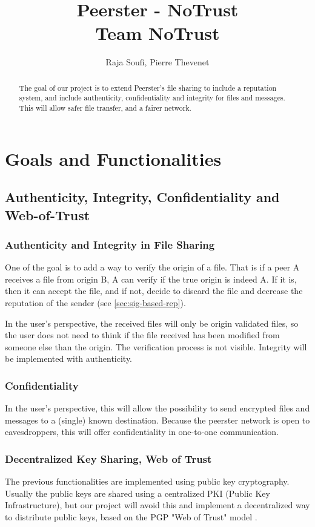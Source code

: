 \documentclass[]{article}
\title{Peerster - NoTrust\\
Team NoTrust}
\author{Raja Soufi, Pierre Thevenet}
\begin{document}
\maketitle

\begin{abstract}
The goal of our project is to extend Peerster's file sharing to include a reputation system, and include authenticity, confidentiality and integrity for files and messages. This will allow safer file transfer, and a fairer network.
\end{abstract}

\section{Goals and Functionalities}

\subsection{Authenticity, Integrity, Confidentiality and Web-of-Trust}

\subsubsection{Authenticity and Integrity in File Sharing}
\label{sec:goals-funcs-auth-integrity}
One of the goal is to add a way to verify the origin of a file. That is if a peer A receives a file from origin B, A can verify if the true origin is indeed A. If it is, then it can accept the file, and if not, decide to discard the file and decrease the reputation of the sender (see \ref{sec:sig-based-rep}). \newline

In the user's perspective, the received files will only be origin validated files, so the user does not need to think if the file received has been modified from someone else than the origin. The verification process is not visible.
Integrity will be implemented with authenticity.

\subsubsection{Confidentiality}
In the user's perspective, this will allow the possibility to send encrypted files and messages to a (single) known destination. Because the peerster network is open to eavesdroppers, this will offer confidentiality in one-to-one communication.

\subsubsection{Decentralized Key Sharing, Web of Trust}
The previous functionalities are implemented using public key cryptography. Usually the public keys are shared using a centralized PKI (Public Key Infrastructure), but our project will avoid this and implement a decentralized way to distribute public keys, based on the PGP "Web of Trust" model \cite{abdul1997pgp}.
\end{document}
